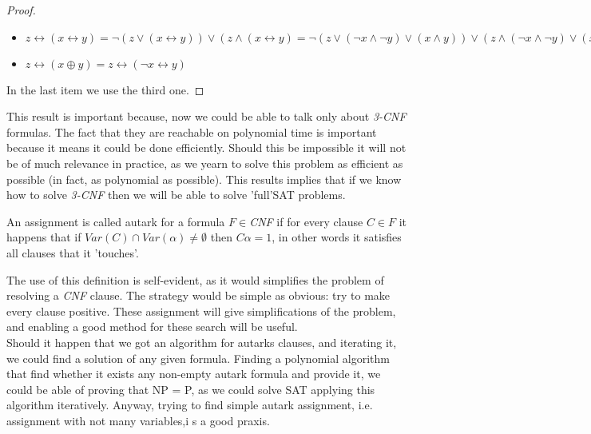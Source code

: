 \begin{proof}
\begin{itemize}
	\item $z \leftrightarrow( x \leftrightarrow y ) =  \neg ( z \vee ( x \leftrightarrow y ) ) \vee (z \wedge ( x \leftrightarrow y ) = \neg ( z \vee (\neg  x \wedge \neg  y) \vee (x \wedge y)) \vee (z \wedge(\neg  x \wedge \neg  y) \vee (x \wedge y))  )=(\neg  z \wedge \neg  (\neg  x \wedge \neg  y) \wedge \neg  (x \wedge y)) \vee (z \wedge(\neg  x \wedge \neg  y) \vee (x \wedge y))  )=(\neg  z \wedge  (x \vee  y) \wedge (\neg  x \vee \neg  y)) \vee (z \wedge(\neg  x \wedge \neg  y) \vee (x \wedge y))  )=z \vee ( \neg  x \wedge \neg  y) = (\neg x \vee \neg y \vee z) \wedge (\neg x \vee \neg z \vee y) \wedge (y \vee z \vee x) \wedge (y \vee \neg y \vee x) \wedge (\neg z \vee z \vee x) \wedge (\neg z \vee \neg y \vee x)$
	
	\item $z \leftrightarrow( x \oplus y ) =  z \leftrightarrow(\neg  x \leftrightarrow y )  $
	
\end{itemize}
	In the last item we use the third one.
	
\end{proof}
This result is important because, now we could be able to talk only about \emph{3-CNF} formulas. The fact that they are reachable on polynomial time is important because it means it could be done efficiently. Should this be impossible it will not be of much relevance in practice, as we yearn to solve this problem as efficient as possible (in fact, as polynomial as possible). This results implies that if we know how to solve \emph{3-CNF} then we will be able to solve 'full'SAT problems.
\begin{definition}
	An assignment is called autark for a formula $F\in$\emph{CNF} if for every clause $C \in F$ it happens that if $Var(C) \cap Var(\alpha) \ne \emptyset $ then $C\alpha = 1$, in other words it satisfies all clauses that it 'touches'. 
\end{definition}

The use of this definition is self-evident, as it would simplifies the problem of resolving a \emph{CNF} clause. The strategy would be simple as obvious: try to make every clause positive. These assignment will give simplifications of the problem, and enabling a good method for these search will be useful.\\ 

Should it happen that we got an algorithm for autarks clauses, and iterating it, we could find a solution of any given formula. Finding a polynomial algorithm that find whether it exists any non-empty autark formula and provide it, we could be able of proving that NP = P, as we could solve SAT applying this algorithm iteratively. Anyway, trying to find simple autark assignment, i.e. assignment with not many variables,i s a good praxis.

